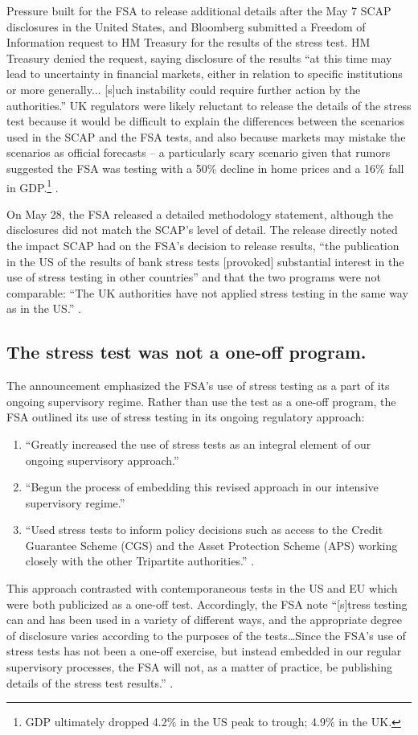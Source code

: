 Pressure built for the FSA to release additional details after the May 7 SCAP disclosures in the United States, and Bloomberg submitted a Freedom of Information request to HM Treasury for the results of the stress test. HM Treasury denied the request, saying disclosure of the results ``at this time may lead to uncertainty in financial markets, either in relation to specific institutions or more generally... [s]uch instability could require further action by the authorities.'' UK regulators were likely reluctant to release the details of the stress test because it would be difficult to explain the differences between the scenarios used in the SCAP and the FSA tests, and also because markets may mistake the scenarios as official forecasts -- a particularly scary scenario given that rumors suggested the FSA was testing with a 50\% decline in home prices and a 16\% fall in GDP.\footnote{GDP ultimately dropped 4.2\% in the US peak to trough; 4.9\% in the UK.} \citep{Murphy}.

On May 28, the FSA released a detailed methodology statement, although the disclosures did not match the SCAP's level of detail. The release directly noted the impact SCAP had on the FSA's decision to release results, ``the publication in the US of the results of bank stress tests [provoked] substantial interest in the use of stress testing in other countries'' and that the two programs were not comparable: ``The UK authorities have not applied stress testing in the same way as in the US.'' \citep{Results}.

\subsection{The stress test was not a one-off program.}

The announcement emphasized the FSA's use of stress testing as a part of its ongoing supervisory regime. Rather than use the test as a one-off program, the FSA outlined its use of stress testing in its ongoing regulatory approach:

\begin{enumerate}
  \item ``Greatly increased the use of stress tests as an integral element of our ongoing supervisory approach.''
  \item ``Begun the process of embedding this revised approach in our intensive supervisory regime.''
  \item ``Used stress tests to inform policy decisions such as access to the Credit Guarantee Scheme (CGS) and the Asset Protection Scheme (APS) working closely with the other Tripartite authorities.'' \citep{Results}.
\end{enumerate}

This approach contrasted with contemporaneous tests in the US and EU which were both publicized as a one-off test. Accordingly, the FSA note ``[s]tress testing can and has been used in a variety of different ways, and the appropriate degree of disclosure varies according to the purposes of the tests\dots Since the FSA’s use of stress tests has not been a one-off exercise, but instead embedded in our regular supervisory processes, the FSA will not, as a matter of practice, be publishing details of the stress test results.'' \citep{Results}.